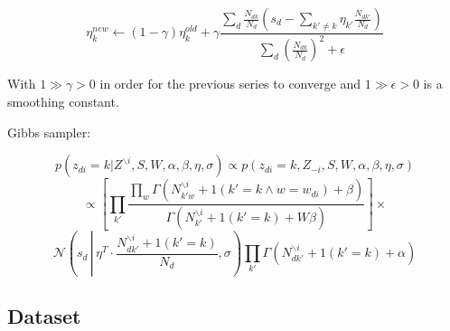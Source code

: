 \documentclass[a4paper,10pt]{report}
\begin{document}
$$ \eta_k^{new} \leftarrow (1 - \gamma) \eta_k^{old} + \gamma \frac{\sum_d \frac{N_{dk}}{N_d} \left( s_d - \sum_{k' \ne k} \eta_{k'} \frac{N_{dk'}}{N_d} \right)}{\sum_d \left( \frac{N_{dk}}{N_d}  \right)^2 + \epsilon}$$

With $1 \gg \gamma > 0$ in order for the previous series to converge and $1 \gg \epsilon > 0$ is a smoothing constant.

Gibbs sampler:

$$ p(z_{di} = k | Z^{\backslash i}, S, W, \alpha, \beta, \eta, \sigma) \propto p(z_{di} = k, Z_{-i}, S, W, \alpha, \beta, \eta, \sigma) $$
$$ \propto \left[ \prod_{k'} \frac{\prod_w \Gamma(N_{{k'}w}^{\backslash i} + 1(k' = k \wedge w = w_{di}) + \beta)}{\Gamma(N_{k'}^{\backslash i} + 1(k' = k) + W \beta)} \right] \times $$
$$ \mathcal{N}\left(s_d\, \left|\, \eta^T \cdot \frac{N_{d{k'}}^{\backslash i} + 1(k' = k)}{N_d}, \sigma\right. \right) \prod_{k'} \Gamma(N_{d{k'}}^{\backslash i} + 1(k' = k) + \alpha) $$

\subsection*{Dataset}
\end{document}
